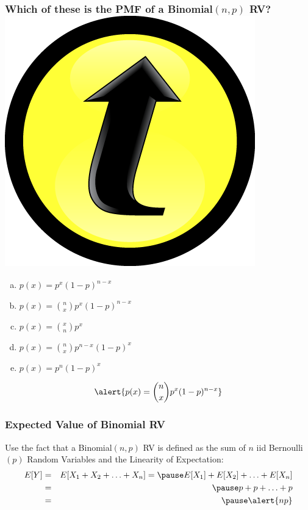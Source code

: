 \documentclass[handout]{beamer}
\begin{document}
\begin{frame}
\frametitle{Which of these is the PMF of a Binomial$(n,p)$ RV? \hfill \includegraphics[scale = 0.05]{./images/clicker}}

\begin{enumerate}[(a)]
	\item $p(x) = p^x (1-p)^{n-x}$
	\item $p(x) = {n \choose x} p^x (1-p)^{n-x}$
	\item $p(x) = {x \choose n} p^x$
	\item $p(x) = {n \choose x} p^{n-x} (1-p)^{x}$
	\item $p(x) = p^n (1-p)^{x}$
\end{enumerate}

\pause
 
$$\alert{p(x) = {n \choose x} p^x (1-p)^{n-x}}$$ 



\end{frame}
\begin{frame}
\frametitle{Expected Value of Binomial RV}

Use the fact that a Binomial$(n,p)$ RV is defined as the sum of $n$ iid Bernoulli$(p)$ Random Variables and the Linearity of Expectation:
\begin{eqnarray*}
E[Y] &=& E[X_1 + X_2 + \hdots + X_n] = \pause E[X_1] + E[X_2] + \hdots +E[X_n]\\
	&=&\pause p + p + \hdots + p\\
	&=& \pause \alert{np}
\end{eqnarray*}
\vspace{3em}
\end{frame}
\end{document}

